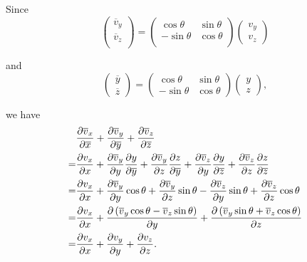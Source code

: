         \begin{sol}[1.17]
        Since
            \begin{equation}
                \begin{pmatrix}
                    \overline{v}_y \\
                    \overline{v}_z \\
                \end{pmatrix}
        = \begin{pmatrix}
            \cos \theta & \sin \theta\\
            -\sin\theta & \cos \theta\\
        \end{pmatrix}
        \begin{pmatrix}
            v_y \\ v_z
        \end{pmatrix}
    \end{equation}

    and
    \begin{equation}
        \begin{pmatrix}
            \overline{y} \\ \overline{z}
        \end{pmatrix}
        = \begin{pmatrix}
            \cos \theta & \sin \theta \\
            -\sin \theta & \cos \theta
        \end{pmatrix}
        \begin{pmatrix}
            y \\ z
        \end{pmatrix},
    \end {equation}

    we have
        \begin{equation}
            \begin{aligned}
                &\frac{\partial \overline{v}_x}{\partial \overline{x}} + \frac{\partial \overline{v}_y}{\partial \overline{y}} + \frac{\partial \overline{v}_z}{\partial \overline{z}} \\
                =&\frac{\partial v_x}{\partial x} + \frac{\partial \overline{v}_y}{\partial y}\frac{\partial y}{\partial \overline{y}} + \frac{\partial \overline{v}_y}{\partial z}\frac{\partial z}{\partial \overline{y}}
                    + \frac{\partial \overline{v}_z}{\partial y}\frac{\partial y}{\partial \overline{z}} + \frac{\partial \overline{v}_z}{\partial z}\frac{\partial z}{\partial \overline{z}} \\
                =&\frac{\partial v_x}{\partial x} + \frac{\partial \overline{v}_y}{\partial y}\cos \theta 
                    + \frac{\partial \overline{v}_y}{\partial z}\sin \theta - \frac{\partial \overline{v}_z}{\partial y} \sin \theta + \frac{\partial \overline{v}_z}{\partial z} \cos \theta \\
                =&\frac{\partial v_x}{\partial x}+\frac{\partial \left(\overline{v}_y\cos\theta - \overline{v}_z\sin\theta\right)}{\partial y} + \frac{\partial \left(\overline{v}_y\sin\theta + \overline{v}_z\cos\theta\right)}{\partial z} \\
                =&\frac{\partial v_x}{\partial x}+\frac{\partial v_y}{\partial y} + \frac{\partial v_z}{\partial z}.
            \end{aligned}
        \end{equation}
\end{sol}

